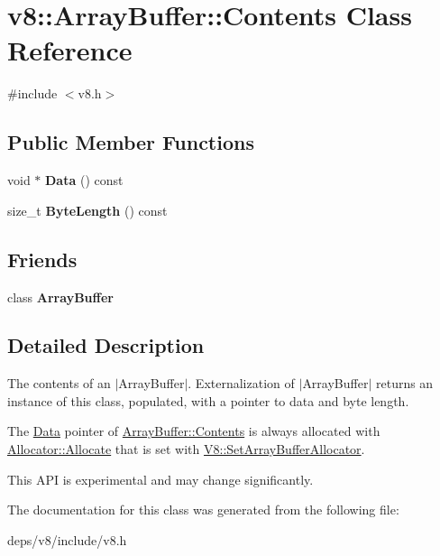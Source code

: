 \hypertarget{classv8_1_1_array_buffer_1_1_contents}{}\section{v8\+:\+:Array\+Buffer\+:\+:Contents Class Reference}
\label{classv8_1_1_array_buffer_1_1_contents}


{\ttfamily \#include $<$v8.\+h$>$}

\subsection*{Public Member Functions}
\begin{DoxyCompactItemize}
\item 
\hypertarget{classv8_1_1_array_buffer_1_1_contents_a9ed7556bfaca7a0b24deb05538a76dcd}{}void $\ast$ {\bfseries Data} () const \label{classv8_1_1_array_buffer_1_1_contents_a9ed7556bfaca7a0b24deb05538a76dcd}

\item 
\hypertarget{classv8_1_1_array_buffer_1_1_contents_a1b6a3eecb4fe05f4d33c83b6bc1fa737}{}size\+\_\+t {\bfseries Byte\+Length} () const \label{classv8_1_1_array_buffer_1_1_contents_a1b6a3eecb4fe05f4d33c83b6bc1fa737}

\end{DoxyCompactItemize}
\subsection*{Friends}
\begin{DoxyCompactItemize}
\item 
\hypertarget{classv8_1_1_array_buffer_1_1_contents_acbcb25033a90500a51aa19c811b2a1d3}{}class {\bfseries Array\+Buffer}\label{classv8_1_1_array_buffer_1_1_contents_acbcb25033a90500a51aa19c811b2a1d3}

\end{DoxyCompactItemize}


\subsection{Detailed Description}
The contents of an $\vert$\+Array\+Buffer$\vert$. Externalization of $\vert$\+Array\+Buffer$\vert$ returns an instance of this class, populated, with a pointer to data and byte length.

The \hyperlink{classv8_1_1_data}{Data} pointer of \hyperlink{classv8_1_1_array_buffer_1_1_contents}{Array\+Buffer\+::\+Contents} is always allocated with \hyperlink{classv8_1_1_array_buffer_1_1_allocator_a106b0d80120ed04fe9b9675e96f0340b}{Allocator\+::\+Allocate} that is set with \hyperlink{classv8_1_1_v8_abc40950a39f8cb6946dc8a1ad41eea84}{V8\+::\+Set\+Array\+Buffer\+Allocator}.

This A\+P\+I is experimental and may change significantly. 

The documentation for this class was generated from the following file\+:\begin{DoxyCompactItemize}
\item 
deps/v8/include/v8.\+h\end{DoxyCompactItemize}
